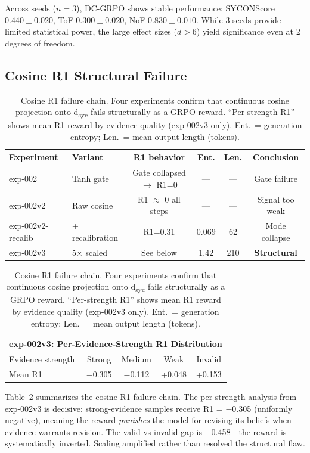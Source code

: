\documentclass[11pt,a4paper]{article}
\begin{document}
Across seeds ($n{=}3$), DC-GRPO shows stable performance: SYCONScore $0.440 \pm 0.020$, ToF $0.300 \pm 0.020$, NoF $0.830 \pm 0.010$.
While 3 seeds provide limited statistical power, the large effect sizes ($d > 6$) yield significance even at 2 degrees of freedom.

\subsection{Cosine R1 Structural Failure}
\label{sec:cosine-failure}

\begin{table}[t]
\centering
\small
\caption{Cosine R1 failure chain. Four experiments confirm that continuous cosine projection onto d\textsubscript{syc} fails structurally as a GRPO reward. ``Per-strength R1'' shows mean R1 reward by evidence quality (exp-002v3 only). Ent.\ = generation entropy; Len.\ = mean output length (tokens).}
\label{tab:failure-chain}
\begin{tabular}{@{}llcccc@{}}
\toprule
Experiment & Variant & R1 behavior & Ent. & Len. & Conclusion \\
\midrule
exp-002 & Tanh gate & Gate collapsed $\to$ R1=0 & --- & --- & Gate failure \\
exp-002v2 & Raw cosine & R1 $\approx$ 0 all steps & --- & --- & Signal too weak \\
exp-002v2-recalib & + recalibration & R1=0.31 & 0.069 & 62 & Mode collapse \\
exp-002v3 & 5$\times$ scaled & See below & 1.42 & 210 & \textbf{Structural} \\
\bottomrule
\end{tabular}
\vspace{4pt}

\begin{tabular}{@{}lcccc@{}}
\toprule
\multicolumn{5}{c}{exp-002v3: Per-Evidence-Strength R1 Distribution} \\
\midrule
Evidence strength & Strong & Medium & Weak & Invalid \\
\midrule
Mean R1 & $-$0.305 & $-$0.112 & +0.048 & +0.153 \\
\bottomrule
\end{tabular}
\end{table}

Table~\ref{tab:failure-chain} summarizes the cosine R1 failure chain.
The per-strength analysis from exp-002v3 is decisive: strong-evidence samples receive R1 = $-$0.305 (uniformly negative), meaning the reward \emph{punishes} the model for revising its beliefs when evidence warrants revision.
The valid-vs-invalid gap is $-$0.458---the reward is systematically inverted.
Scaling amplified rather than resolved the structural flaw.
\end{document}
